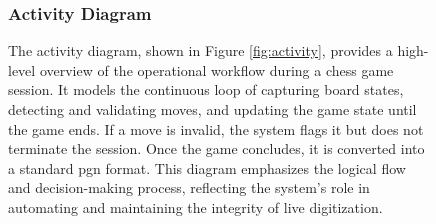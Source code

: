 \begin{figure}[H]
    \subsubsection*{Activity Diagram}
    \label{subsubsec:activity-diagram}
    
    \centering
    \begin{minipage}[t]{0.5\textwidth}
        \vspace{0pt}
        The activity diagram, shown in Figure \ref{fig:activity}, provides a high-level overview of the operational workflow during a chess game session. It models the continuous loop of capturing board states, detecting and validating moves, and updating the game state until the game ends. If a move is invalid, the system flags it but does not terminate the session. Once the game concludes, it is converted into a standard \gls{pgn} format. This diagram emphasizes the logical flow and decision-making process, reflecting the system’s role in automating and maintaining the integrity of live digitization.
    \end{minipage}
    \hfill
    \begin{minipage}[t]{0.45\textwidth}
        \vspace{0pt}

\end{minipage}
\end{figure}

